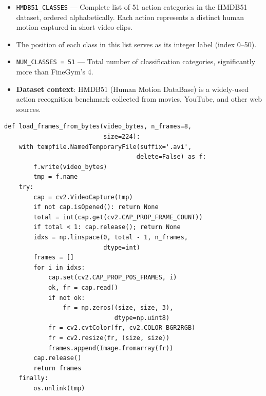 \begin{explanation}
\begin{itemize}[nosep]
  \item \texttt{HMDB51\_CLASSES} --- Complete list of 51 action categories in the HMDB51 dataset, ordered alphabetically. Each action represents a distinct human motion captured in short video clips.
  \item The position of each class in this list serves as its integer label (index 0--50).
  \item \texttt{NUM\_CLASSES = 51} --- Total number of classification categories, significantly more than FineGym's 4.
  \item \textbf{Dataset context}: HMDB51 (Human Motion DataBase) is a widely-used action recognition benchmark collected from movies, YouTube, and other web sources.
\end{itemize}
\end{explanation}

\begin{lstlisting}
def load_frames_from_bytes(video_bytes, n_frames=8,
                           size=224):
    with tempfile.NamedTemporaryFile(suffix='.avi',
                                    delete=False) as f:
        f.write(video_bytes)
        tmp = f.name
    try:
        cap = cv2.VideoCapture(tmp)
        if not cap.isOpened(): return None
        total = int(cap.get(cv2.CAP_PROP_FRAME_COUNT))
        if total < 1: cap.release(); return None
        idxs = np.linspace(0, total - 1, n_frames,
                           dtype=int)
        frames = []
        for i in idxs:
            cap.set(cv2.CAP_PROP_POS_FRAMES, i)
            ok, fr = cap.read()
            if not ok:
                fr = np.zeros((size, size, 3),
                              dtype=np.uint8)
            fr = cv2.cvtColor(fr, cv2.COLOR_BGR2RGB)
            fr = cv2.resize(fr, (size, size))
            frames.append(Image.fromarray(fr))
        cap.release()
        return frames
    finally:
        os.unlink(tmp)
\end{lstlisting}

